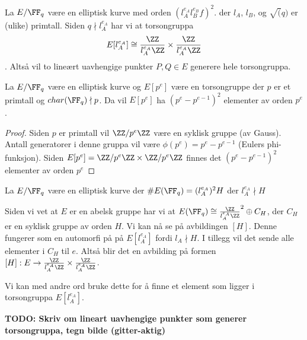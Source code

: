 \begin{eksempel}
La $E/\FF_q$ være en elliptisk kurve med orden $( l_A^{e_A} l_B^{e_B}f) ^2$. der $l_A$, $l_B$, og $\sqrt(q)$ er (ulike) primtall. Siden $q \nmid l_A^{e_A}$ har vi at torsongruppa $$E[l_A^{e_A}] \cong \frac{\ZZ}{l_A^{e_A} \ZZ} \times \frac{\ZZ}{l_A^{e_A} \ZZ}$$. Altså vil to lineært uavhengige punkter $P, Q \in E$ generere hele torsongruppa. 
\end{eksempel}


\begin{proposisjon}
\label{torson_generatorer}
La $E/\FF_q$ være en elliptisk kurve og $E[p^e]$ være en torsongruppe der $p$ er et primtall og $char(\FF_q) \nmid p$. Da vil $E[p^e]$ ha $(p^e - p^{e-1})^2$ elementer av orden $p^e$. 

\begin{proof}
Siden $p$ er primtall vil $\ZZ / p^e\ZZ$ være en syklisk gruppe (av Gauss). Antall generatorer i denne gruppa vil være $\phi(p^e) = p^e - p^{e-1}$ (Eulers phi-funksjon). Siden $E[p^e] = \ZZ / p^e\ZZ \times \ZZ / p^e\ZZ$ finnes det $(p^e - p^{e-1})^2$ elementer av orden $p^e$
\end{proof}
\end{proposisjon}

\begin{eksempel}
\label{torson_automorfi}
La $E/\FF_q$ være en elliptisk kurve der $\#E(\FF_q) = (l_A^{e_A})^2H$ der $l_A^{e_A} \nmid H$ 

Siden vi vet at $E$ er en abelsk gruppe har vi at $E(\FF_q) \cong \frac{\ZZ}{l_A^{e_A} \ZZ}^2 \oplus C_H$, der $C_H$ er en syklisk gruppe av orden $H$. Vi kan nå se på avbildingen $[H]$. Denne fungerer som en automorfi på på $E[l_A^{e_A}]$ fordi $l_A \nmid H$. I tillegg vil det sende alle elementer i $C_H$ til $e$. Altså blir det en avbilding på formen $[H]: E \rightarrow  \frac{\ZZ}{l_A^{e_A} \ZZ} \times \frac{\ZZ}{l_A^{e_A} \ZZ}$. 

Vi kan med andre ord bruke dette for å finne et element som ligger i torsongruppa $E[l_A^{e_A}]$.
\end{eksempel}



\textbf{TODO: Skriv om lineart uavhengige punkter som generer torsongruppa, tegn bilde (gitter-aktig)}